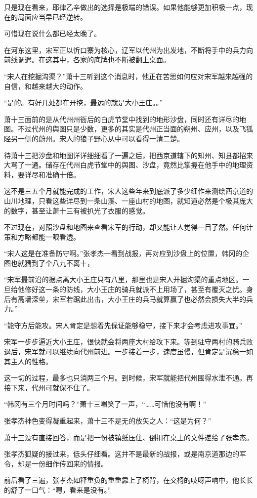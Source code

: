 只是现在看来，耶律乙辛做出的选择是极端的错误。如果他能够更加积极一点，现在的局面应当早已经逆转。

可惜现在说什么都已经太晚了。

在河东这里，宋军正以忻口寨为核心，辽军以代州为出发地，不断将手中的兵力向前线调遣。在这其中，各家的底牌也不断被翻上桌面。

“宋人在挖掘沟渠？”萧十三听到这个消息时，他正在苦思如何应对宋军越来越强的自信，和越来越大的动作。

“是的。有好几处都在开挖，最远的就是大小王庄。。”

萧十三面前的是从代州州衙后的白虎节堂中找到的地形沙盘，同时还有详尽的地图。不过代州的舆图只是少数，更多的其实是代州正当面的朔州、应州，以及飞狐陉另一侧的蔚州。宋人的狼子野心从中可以看得一清二楚。

待萧十三把沙盘和地图详详细细看了一遍之后，把西京道辖下的知州、知县都招来大骂了一通。储存在代州白虎节堂中的舆图、沙盘，竟然比掌握在他手中的地理资料，要详尽和准确十倍。

这不是三五个月就能完成的工作，宋人这些年来到底派了多少细作来测绘西京道的山川地理，只看这些详尽到一条山溪、一座山村的地图，就知道必然是个极其庞大的数字，甚至让萧十三有被扒光了衣服的感觉。

不过现在，对照沙盘和地图来查看宋军的行动，却又能让人觉得一目了然。任何计策和方略都能一眼看透。

“宋人这是在准备防守啊。”张孝杰一看到战报，再对应到沙盘上的位置，韩冈的企图也就猜到了个八九不离十，

“宋军最前沿的据点离大小王庄只有八里，那里也是宋人开掘沟渠的重点地区。一旦给他修好这一条的防线，大小王庄的骑兵就派不上用场了，甚至有覆灭之忧。身后有高墙深垒，宋军若踞此出击，大小王庄的兵马就算赢了也必然会损失大半的兵力。”

“能守方后能攻。宋人肯定是想着先保证能够稳守，接下来才会考虑进攻事宜。”

宋军一步步逼近大小王庄，很快就会将两座大村给攻下来。等到驻守两村的骑兵败退后，宋军就可以继续向代州前进。一步接着一步，速度虽慢，但肯定是沉稳一如其主人的性格。

这一切的过程，最多也只消两三个月。到时候，宋军就能把代州围得水泄不通。再接下来，代州可就保不住了。

“韩冈有三个月时间吗？”萧十三嗤笑了一声，“……可惜他没有啊！”

张孝杰神色变得凝重起来，萧十三不是无的放矢之人：“这是为何？”

萧十三没有直接回答，而是把一份被镇纸压住、倒扣在桌上的文件递给了张孝杰。

张孝杰狐疑的接过来，低头仔细看。这并不是最新的战报，或是南京道那边的军令，却是一份细作传回来的情报。

前后看了三遍，张孝杰如释重负的重重靠上了椅背，在交椅的吱呀声响中，他长长的舒了一口气：“嗯，看来是没有。”
